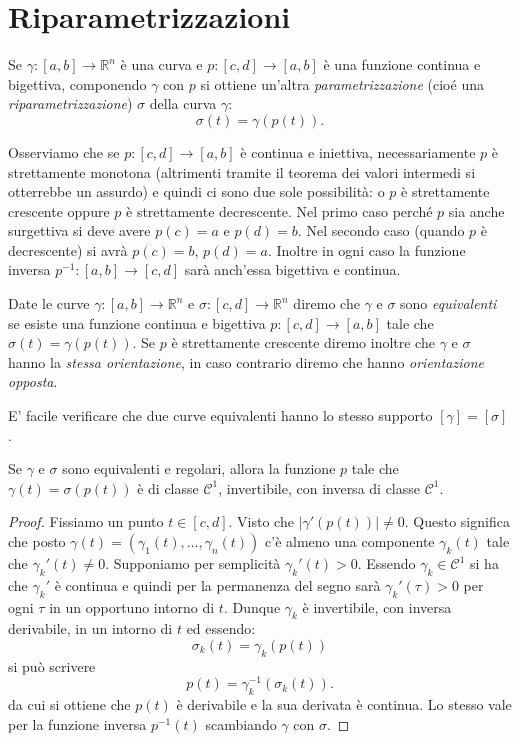 \documentclass[italian,a4paper]{scrartcl}
\newcommand{\RR}{{\mathbb R}}
\newcommand{\C}{{\mathcal C}}
\begin{document}
\section{Riparametrizzazioni}

Se $\gamma\colon [a,b]\to \RR^n$ è una curva e $p\colon [c,d]\to
[a,b]$ è una funzione continua e bigettiva, componendo $\gamma$ con
$p$ si ottiene un'altra \emph{parametrizzazione} 
(cioé una
\emph{riparametrizzazione}) $\sigma$ della curva 
$\gamma$:
\[ 
\sigma(t) = \gamma(p(t)).
\]

Osserviamo che se $p\colon [c,d] \to [a,b]$ è continua e iniettiva,
necessariamente $p$ è strettamente monotona (altrimenti tramite il
teorema dei valori intermedi si otterrebbe un assurdo) e quindi ci
sono due sole possibilità: o $p$ è strettamente crescente oppure $p$ è
strettamente decrescente. Nel primo caso perché $p$ sia anche
surgettiva si deve avere $p(c)=a$ e $p(d)=b$. Nel secondo caso (quando
$p$ è decrescente) si avrà $p(c) = b$, $p(d) = a$. Inoltre in ogni
caso la funzione inversa $p^{-1}\colon [a,b] \to [c,d]$ sarà anch'essa
bigettiva e continua.

Date le curve $\gamma\colon [a,b]\to \RR^n$ e $\sigma\colon[c,d] \to
\RR^n$ diremo che $\gamma$ e $\sigma$ sono \emph{equivalenti} se
esiste una funzione continua e bigettiva $p\colon[c,d]\to [a,b]$ tale
che $\sigma(t) = \gamma(p(t))$. Se $p$ è strettamente crescente diremo
inoltre che $\gamma$ e $\sigma$ hanno la 
\emph{stessa orientazione},
in caso contrario diremo che hanno \emph{orientazione opposta}.

E' facile verificare che due curve equivalenti hanno lo stesso supporto $[\gamma] =
[\sigma]$.

\begin{lemma}
Se $\gamma$ e $\sigma$ sono equivalenti e regolari, allora la funzione
$p$ tale che $\gamma(t) = \sigma(p(t))$ è di classe $\C^1$,
invertibile, con inversa di classe $\C^1$.
\end{lemma}

\begin{proof}
Fissiamo un punto $t\in [c,d]$. Visto che $\lvert \gamma'(p(t))\rvert
\neq 0$. Questo significa che posto $\gamma(t) =
(\gamma_1(t),\dots,\gamma_n(t))$ c'è almeno una componente
$\gamma_k(t)$ tale che $\gamma_k'(t)\neq 0$. Supponiamo per semplicità
$\gamma_k'(t)>0$. Essendo $\gamma_k\in \C^1$ si ha che $\gamma_k'$ è
continua e quindi per la permanenza del segno sarà $\gamma_k'(\tau)
>0$ 
per ogni $\tau$ in un opportuno intorno di $t$. Dunque $\gamma_k$ è
invertibile, con inversa derivabile, in un intorno di $t$ ed essendo:
\[
  \sigma_k(t) = \gamma_k(p(t))
\]
si può scrivere
\[
  p(t) = \gamma_k^{-1}(\sigma_k(t)).
\]
da cui si ottiene che $p(t)$ è derivabile e la sua derivata è
continua. Lo stesso vale per la funzione inversa $p^{-1}(t)$
scambiando $\gamma$ con $\sigma$.
\end{proof}
\end{document}
